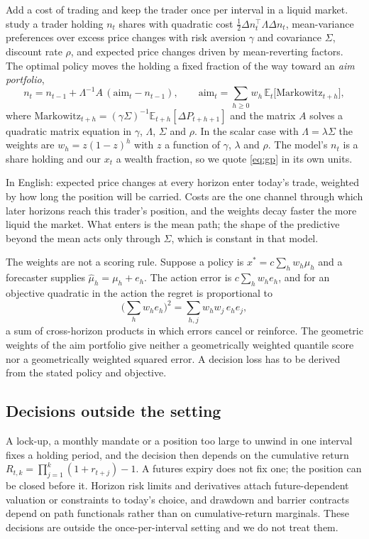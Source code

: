 \documentclass[11pt]{article}
\newcommand{\E}{\mathbb{E}}
\begin{document}
Add a cost of trading and keep the trader once per interval in a liquid market. \citet{garleanu2013} study a trader holding $n_t$ shares with quadratic cost $\tfrac{1}{2}\Delta n_t^\top \Lambda \Delta n_t$, mean-variance preferences over excess price changes with risk aversion $\gamma$ and covariance $\Sigma$, discount rate $\rho$, and expected price changes driven by mean-reverting factors. The optimal policy moves the holding a fixed fraction of the way toward an \emph{aim portfolio},
\begin{equation}
n_t = n_{t-1} + \Lambda^{-1} A\,(\mathrm{aim}_t - n_{t-1}), \qquad
\mathrm{aim}_t = \sum_{h \ge 0} w_h\, \E_t\!\big[\mathrm{Markowitz}_{t+h}\big],
\label{eq:gp}
\end{equation}
where $\mathrm{Markowitz}_{t+h} = (\gamma \Sigma)^{-1} \E_{t+h}[\Delta P_{t+h+1}]$ and the matrix $A$ solves a quadratic matrix equation in $\gamma$, $\Lambda$, $\Sigma$ and $\rho$. In the scalar case with $\Lambda = \lambda \Sigma$ the weights are $w_h = z(1-z)^h$ with $z$ a function of $\gamma$, $\lambda$ and $\rho$. The model's $n_t$ is a share holding and our $x_t$ a wealth fraction, so we quote \eqref{eq:gp} in its own units.

In English: expected price changes at every horizon enter today's trade, weighted by how long the position will be carried. Costs are the one channel through which later horizons reach this trader's position, and the weights decay faster the more liquid the market. What enters is the mean path; the shape of the predictive beyond the mean acts only through $\Sigma$, which is constant in that model.

The weights are not a scoring rule. Suppose a policy is $x^\ast = c \sum_h w_h \mu_h$ and a forecaster supplies $\hat\mu_h = \mu_h + e_h$. The action error is $c \sum_h w_h e_h$, and for an objective quadratic in the action the regret is proportional to
\[
\Big(\sum_h w_h e_h\Big)^2 = \sum_{h,j} w_h w_j\, e_h e_j,
\]
a sum of cross-horizon products in which errors cancel or reinforce. The geometric weights of the aim portfolio give neither a geometrically weighted quantile score nor a geometrically weighted squared error. A decision loss has to be derived from the stated policy and objective.

\subsection{Decisions outside the setting}

A lock-up, a monthly mandate or a position too large to unwind in one interval fixes a holding period, and the decision then depends on the cumulative return $R_{t,k} = \prod_{j=1}^{k}(1 + r_{t+j}) - 1$. A futures expiry does not fix one; the position can be closed before it. Horizon risk limits and derivatives attach future-dependent valuation or constraints to today's choice, and drawdown and barrier contracts depend on path functionals rather than on cumulative-return marginals. These decisions are outside the once-per-interval setting and we do not treat them.
\end{document}
